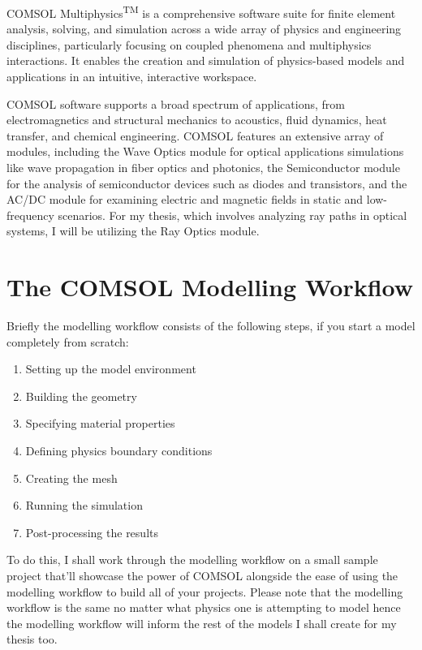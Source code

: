 COMSOL Multiphysics\textsuperscript{TM} is a comprehensive software suite for finite element analysis, solving, and simulation across a wide array of physics and engineering disciplines, particularly focusing on coupled phenomena and multiphysics interactions. It enables the creation and simulation of physics-based models and applications in an intuitive, interactive workspace.

COMSOL software supports a broad spectrum of applications, from electromagnetics and structural mechanics to acoustics, fluid dynamics, heat transfer, and chemical engineering. COMSOL features an extensive array of modules, including the Wave Optics module for optical applications simulations like wave propagation in fiber optics and photonics, the Semiconductor module for the analysis of semiconductor devices such as diodes and transistors, and the AC/DC module for examining electric and magnetic fields in static and low-frequency scenarios. For my thesis, which involves analyzing ray paths in optical systems, I will be utilizing the Ray Optics module.

\section{The COMSOL Modelling Workflow}
Briefly the modelling workflow consists of the following steps, if you start a model completely from scratch:
\begin{enumerate}
    \item Setting up the model environment
    \item Building the geometry
    \item Specifying material properties
    \item Defining physics boundary conditions
    \item Creating the mesh
    \item Running the simulation
    \item Post-processing the results
\end{enumerate}

To do this, I shall work through the modelling workflow on a small sample project that'll showcase the power of COMSOL alongside the ease of using the modelling workflow to build all of your projects. Please note that the modelling workflow is the same no matter what physics one is attempting to model hence the modelling workflow will inform the rest of the models I shall create for my thesis too.

